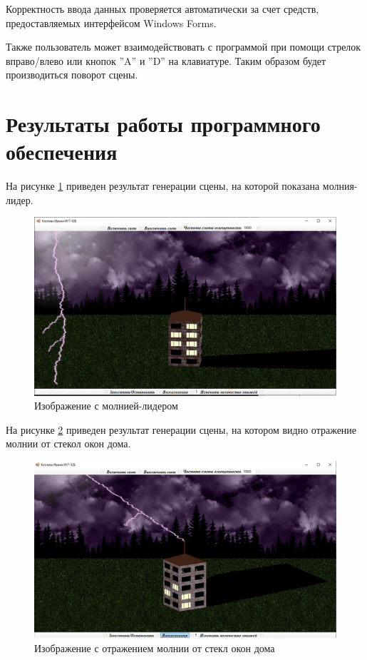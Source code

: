 Корректность ввода данных проверяется автоматически за счет средств, предоставляемых интерфейсом Windows Forms. 

Также пользователь может взаимодействовать с программой при помощи стрелок вправо/влево или кнопок ''A'' и ''D'' на клавиатуре. Таким образом будет производиться поворот сцены.


\section{Результаты работы программного обеспечения}

На рисунке \ref{img:t1} приведен результат генерации сцены, на которой показана молния-лидер.

\begin{figure}[H]
	\begin{center}
		\includegraphics[scale=0.38]{img/prog_res/t1.png}
	\end{center}
	\captionsetup{justification=centering}
	\caption{Изображение с молнией-лидером}
	\label{img:t1}
\end{figure}

На рисунке \ref{img:t2} приведен результат генерации сцены, на котором видно отражение молнии от стекол окон дома.

\begin{figure}[H]
	\begin{center}
		\includegraphics[scale=0.38]{img/prog_res/t2.png}
	\end{center}
	\captionsetup{justification=centering}
	\caption{Изображение с отражением молнии от стекл окон дома}
	\label{img:t2}
\end{figure}

